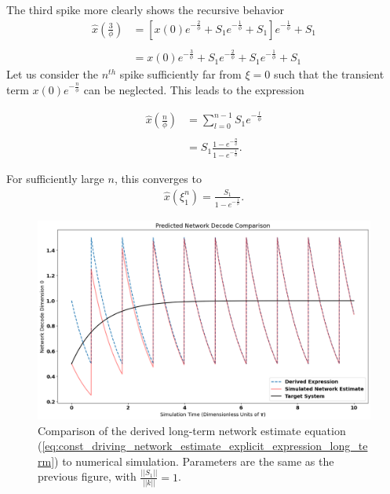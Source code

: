 \begin{enumerate}
The third spike more clearly shows the recursive behavior
\begin{align*}
\hat{x}(\frac{3}{\phi}) &= \left[x(0)
e^{-\frac{2}{\phi}} + S_1 e^{-\frac{1}{\phi}} 
+ S_1\right] e^{-\frac{1}{\phi}} + S_1\\
\\
&= x(0) e^{-\frac{3}{\phi}} + S_1 e^{-\frac{2}{\phi}} 
+ S_1 e^{-\frac{1}{\phi}} + S_1
\end{align*}
Let us consider the $n^{th}$ spike sufficiently far from $\xi=0$ such that the transient term $x(0)e^{-\frac{n}{\phi}}$ can be neglected. This leads to the expression

\begin{align*}
\hat{x}(\frac{n}{\phi}) &= \sum_{l=0}^{n-1} S_1 e^{- \frac{l}{\phi}}  \\
\\
&= S_1 \frac
{ 1 - e^{-\frac{n}{\phi}}  }
{ 1 - e^{-\frac{1}{\phi}}  }.
\end{align*}

For sufficiently large $n$, this converges to 
\begin{align}
\label{eq:steady_state_estimate_const_driving}
\hat{x}(\xi_1^n) = \frac{S_1}{1 - e^{-\frac{1}{\phi}}}.
\end{align}


\begin{figure}[h]
\centering
\includegraphics[width=\linewidth]{figures/network_decode_long_term_estimate.png}
\caption{Comparison of the derived long-term network estimate equation (\ref{eq:const_driving_network_estimate_explicit_expression_long_term}) to numerical simulation. Parameters are the same as the previous figure, with $\frac{||S_1||}{||k||} = 1$.}
\label{fig:const_driving_convergence_to_derived_spike_readout}
\end{figure}


\end{enumerate}
